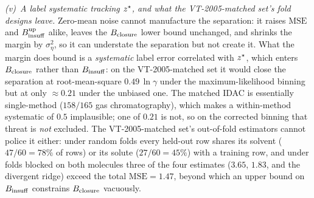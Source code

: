 \emph{(v)~A label systematic tracking $z^\star$, and what the VT-2005-matched set's fold designs leave.} Zero-mean
noise cannot manufacture the separation: it raises $\mathrm{MSE}$ and $B_{\mathrm{insuff}}^{\mathrm{up}}$ alike,
leaves the $B_{\mathrm{closure}}$ lower bound unchanged, and shrinks the margin by $\sigma_\eta^2$, so it can
understate the separation but not create it. What the margin does bound is a \emph{systematic} label
error correlated with $z^\star$, which enters $B_{\mathrm{closure}}$ rather than $B_{\mathrm{insuff}}$: on the VT-2005-matched set it would
close the separation at root-mean-square $0.49\,\ln\gamma$ under the maximum-likelihood binning but
at only ${\approx}0.21$ under the unbiased one. The matched IDAC is essentially
single-method ($158/165$ gas chromatography), which makes a within-method systematic of $0.5$
implausible; one of $0.21$ is not, so on the corrected binning that threat is \emph{not} excluded.
The VT-2005-matched set's out-of-fold estimators cannot police it either: under random folds every held-out row
shares its solvent ($47/60=78\%$ of rows) or its solute ($27/60=45\%$) with a training row, and under folds
blocked on both molecules three of the four estimates ($3.65$, $1.83$, and the divergent ridge)
exceed the total $\mathrm{MSE}=1.47$, beyond which an upper bound on $B_{\mathrm{insuff}}$ constrains $B_{\mathrm{closure}}$
vacuously.

